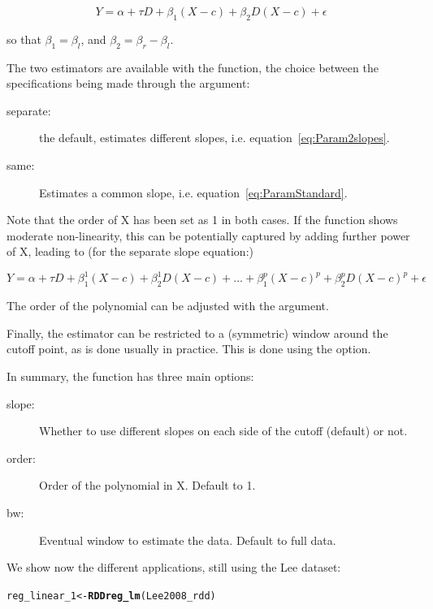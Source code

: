 \documentclass[english,nojss]{jss}\usepackage{graphicx, color}
\makeatletter
\newcommand{\hlfunctioncall}[1]{\textcolor[rgb]{0.501960784313725,0,0.329411764705882}{\textbf{#1}}}%
\newenvironment{kframe}{%
 \def\at@end@of@kframe{}%
 \ifinner\ifhmode%
  \def\at@end@of@kframe{\end{minipage}}%
  \begin{minipage}{\columnwidth}%
 \fi\fi%
 \def\FrameCommand##1{\hskip\@totalleftmargin \hskip-\fboxsep
 \colorbox{shadecolor}{##1}\hskip-\fboxsep
     \hskip-\linewidth \hskip-\@totalleftmargin \hskip\columnwidth}%
 \MakeFramed {\advance\hsize-\width
   \@totalleftmargin\z@ \linewidth\hsize
   \@setminipage}}%
 {\par\unskip\endMakeFramed%
 \at@end@of@kframe}
\newenvironment{knitrout}{}{} %
\makeatother
\begin{document}
\begin{equation}
Y=\alpha+\tau D+\beta_{1}(X-c)+\beta_{2}D(X-c)+\epsilon\label{eq:Param2slopes}
\end{equation}


so that $\beta_{1}=\beta_{l}$, and $\beta_{2}=\beta_{r}-\beta_{l}$. 

The two estimators are available with the  function,
the choice between the specifications being made through the 
argument:
\begin{description}
\item [{separate:}] the default, estimates different slopes, i.e. equation~\ref{eq:Param2slopes}.
\item [{same:}] Estimates a common slope, i.e. equation~\ref{eq:ParamStandard}.
\end{description}
Note that the order of X has been set as 1 in both cases. If the function
shows moderate non-linearity, this can be potentially captured by
adding further power of X, leading to (for the separate slope equation:)

\begin{equation}
Y=\alpha+\tau D+\beta_{1}^{1}(X-c)+\beta_{2}^{1}D(X-c)+\ldots+\beta_{1}^{p}(X-c)^{p}+\beta_{2}^{p}D(X-c)^{p}+\epsilon\label{eq:ParamSlopesPowers}
\end{equation}


The order of the polynomial can be adjusted with the 
argument. 

Finally, the estimator can be restricted to a (symmetric) window around
the cutoff point, as is done usually in practice. This is done using
the  option. 

In summary, the function  has three main options: 
\begin{description}
\item [{slope:}] Whether to use different slopes on each side of the cutoff
(default) or not.
\item [{order:}] Order of the polynomial in X. Default to 1.
\item [{bw:}] Eventual window to estimate the data. Default to full data. 
\end{description}
We show now the different applications, still using the Lee dataset:

\begin{knitrout}
\color{fgcolor}\begin{kframe}
\begin{alltt}
reg_linear_1 <- \hlfunctioncall{RDDreg_lm}(Lee2008_rdd)
\end{alltt}
\end{kframe}
\end{knitrout}
\end{document}
